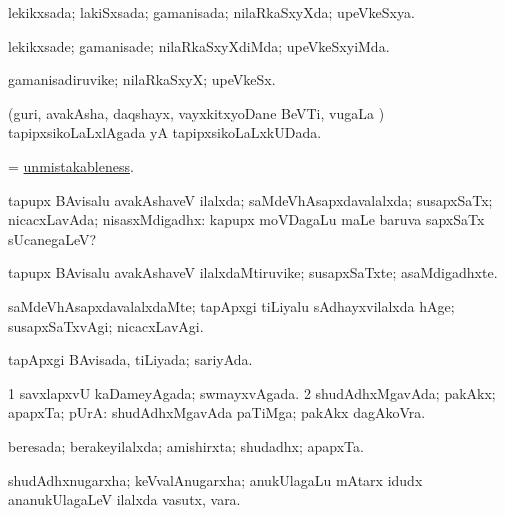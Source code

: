 \bentry
{} 
\gl{\gu}
\expl{}
\bmng
lekikxsada; lakiSxsada; gamanisada; nilaRkaSxyXda; upeVkeSxya. 
\emng
\eentry

\bentry
{} 
\gl{\kirxvi}
\expl{}
\bmng
lekikxsade; gamanisade; nilaRkaSxyXdiMda; upeVkeSxyiMda. 
\emng
\eentry

\bentry
{} 
\gl{\nA}
\expl{}
\bmng
gamanisadiruvike; nilaRkaSxyX; upeVkeSx. 
\emng
\eentry

\bentry
{} 
\gl{\gu}
\expl{}
\bmng
(guri, avakAsha, daqshayx, vayxkitxyoDane BeVTi, \mo vugaLa \vi) tapipxsikoLaLxlAgada yA tapipxsikoLaLxkUDada. 
\emng
\eentry

\bentry
{} 
\gl{\nA}
\expl{}
\bmng
= \hyperlink{unmistakableness}{unmistakableness}. 
\emng
\eentry

\bentry
{} 
\gl{\gu}
\expl{}
\bmng
tapupx BAvisalu avakAshaveV ilalxda; saMdeVhAsapxdavalalxda; susapxSaTx; nicacxLavAda; nisasxMdigadhx:  kapupx moVDagaLu maLe baruva sapxSaTx sUcanegaLeV? 
\emng
\eentry

\bentry
{} 
\gl{\nA}
\expl{}
\bmng
tapupx BAvisalu avakAshaveV ilalxdaMtiruvike; susapxSaTxte; asaMdigadhxte. 
\emng
\eentry

\bentry
{} 
\gl{\kirxvi}
\expl{}
\bmng
saMdeVhAsapxdavalalxdaMte; tapApxgi tiLiyalu sAdhayxvilalxda hAge; susapxSaTxvAgi; nicacxLavAgi. 
\emng
\eentry

\bentry
{} 
\gl{\gu}
\expl{}
\bmng
tapApxgi BAvisada, tiLiyada; sariyAda. 
\emng
\eentry

\bentry
{} 
\gl{\gu}
\expl{}
\bmng
\bnum
\num{1} savxlapxvU kaDameyAgada; swmayxvAgada. 
\num{2} shudAdhxMgavAda; pakAkx; apapxTa; pUrA:  shudAdhxMgavAda paTiMga; pakAkx dagAkoVra. 
\enum
\emng
\eentry

\bentry
{} 
\gl{\gu}
\expl{}
\bmng
beresada; berakeyilalxda; amishirxta; shudadhx; apapxTa. 
\emng

\noindent
\gl{\pagu}
\expl{}
\bmng
{} shudAdhxnugarxha; keVvalAnugarxha; anukUlagaLu mAtarx idudx ananukUlagaLeV ilalxda vasutx, vara. 
\emng
\eentry

